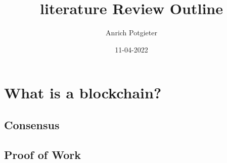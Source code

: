 \documentclass[12pt]{article}
\title{literature Review Outline}
\author{Anrich Potgieter}
\date{11-04-2022}
\begin{document}
\maketitle
\tableofcontents

\section{What is a blockchain?}
\subsection{Consensus}
\subsection{Proof of Work}
\end{document}
